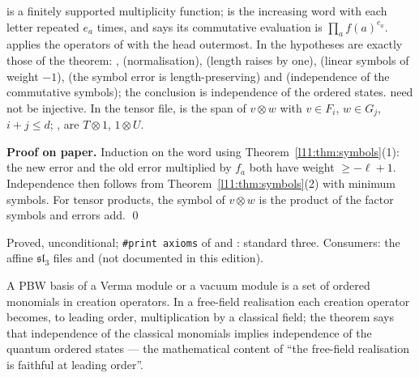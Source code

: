 \begin{dictionary}
 is a finitely supported multiplicity function; \allowbreak{}\allowbreak{} is the increasing
word with each letter repeated $e_a$ times, and \allowbreak{} says its commutative evaluation is
$\prod_af(a)^{e_a}$.  applies the operators of  with the head outermost. In
\allowbreak{} the hypotheses are exactly those of the theorem: , 
(normalisation),  (length raises by one),  (linear symbols of weight $-1$),  (the
symbol error is length-preserving) and  (independence of the commutative symbols); the conclusion is
independence of the ordered states.  need not be injective. In the tensor file, 
is the span of $v\otimes w$ with $v\in F_i$, $w\in G_j$, $i+j\le d$; ,  are $T\otimes1$,
$1\otimes U$.
\end{dictionary}

\textbf{Proof on paper.} Induction on the word using Theorem~\ref{l11:thm:symbols}(1): the new error and the old
error multiplied by $f_a$ both have weight $\ge-\ell+1$. Independence then follows from
Theorem~\ref{l11:thm:symbols}(2) with minimum symbols. For tensor products, the symbol of $v\otimes w$ is the
product of the factor symbols and errors add. \qed

\begin{status}
Proved, unconditional; \texttt{\#print axioms} of \allowbreak{}\allowbreak{} and
\allowbreak{}\allowbreak{}\allowbreak{}: standard three. Consumers: the affine $\mathfrak{sl}_3$ files  and
 (not documented in this edition).
\end{status}

\begin{physics}
A PBW basis of a Verma module or a vacuum module is a set of ordered monomials in creation operators. In a free-field
realisation each creation operator becomes, to leading order, multiplication by a classical field; the theorem says
that independence of the classical monomials implies independence of the quantum ordered states --- the
mathematical content of ``the free-field realisation is faithful at leading order''.
\end{physics}

